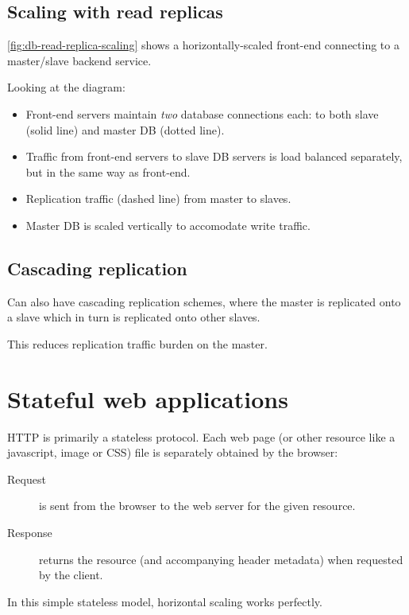 \documentclass[slides]{pgnotes}
\begin{document}
\subsection{Scaling with read replicas}

\autoref{fig:db-read-replica-scaling} shows a horizontally-scaled front-end connecting to a master/slave backend service.


Looking at the diagram:
\begin{itemize}
\item Front-end servers maintain \textit{two} database connections each: to both slave (solid line) and master DB (dotted line).
\item Traffic from front-end servers to slave DB servers is load balanced separately, but in the same way as front-end.
\item Replication traffic (dashed line) from master to slaves.
\item Master DB is scaled vertically to accomodate write traffic.
\end{itemize}

\subsection{Cascading replication}

Can also have cascading replication schemes, where the master is replicated onto a slave which in turn is replicated onto other slaves.

This reduces replication traffic burden on the master.



\section{Stateful web applications}

HTTP is primarily a stateless protocol.
Each web page (or other resource like a javascript, image or CSS) file is separately obtained by the browser:
\begin{description}
\item[Request] is sent from the browser to the web server for the given resource.
\item[Response] returns the resource (and accompanying header metadata) when requested by the client.
\end{description}
In this simple stateless model, horizontal scaling works perfectly.
\end{document}
